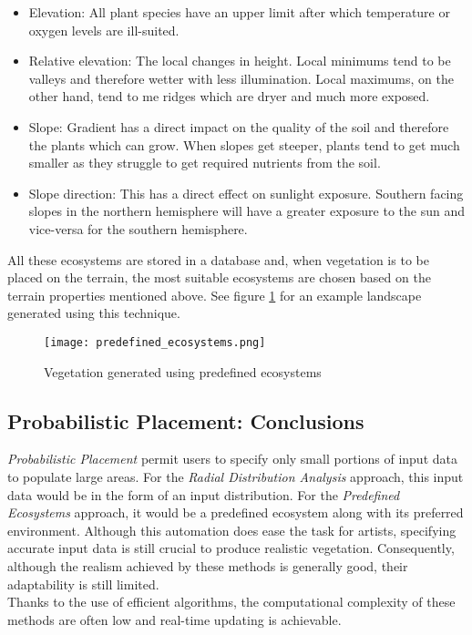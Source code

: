 \begin{itemize}
\item Elevation: All plant species have an upper limit after which temperature or oxygen levels are ill-suited.
\item Relative elevation: The local changes in height. Local minimums tend to be valleys and therefore wetter with less illumination. Local maximums, on the other hand, tend to me ridges which are dryer and much more exposed.
\item Slope: Gradient has a direct impact on the quality of the soil and therefore the plants which can grow. When slopes get steeper, plants tend to get much smaller as they struggle to get required nutrients from the soil.
\item Slope direction: This has a direct effect on sunlight exposure. Southern facing slopes in the northern hemisphere will have a greater exposure to the sun and vice-versa for the southern hemisphere.  
\end{itemize}

All these ecosystems are stored in a database and, when vegetation is to be placed on the terrain, the most suitable ecosystems are chosen based on the terrain properties mentioned above. See figure \ref{fig:vegetation_generated_using_predefined_ecosystems} for an example landscape generated using this technique.

\begin{figure}[h]
  \centering
	\texttt{[image: predefined\_ecosystems.png]}
	\caption{Vegetation generated using predefined ecosystems \cite{Hammes2001}}
	\label{fig:vegetation_generated_using_predefined_ecosystems}
\end{figure}

\subsection{Probabilistic Placement: Conclusions}

\textit{Probabilistic Placement} permit users to specify only small portions of input data to populate large areas. For the \textit{Radial Distribution Analysis} approach, this input data would be in the form of an input distribution. For the \textit{Predefined Ecosystems} approach, it would be a predefined ecosystem along with its preferred environment. Although this automation does ease the task for artists, specifying accurate input data is still crucial to produce realistic vegetation. Consequently, although the realism achieved by these methods is generally good, their adaptability is still limited. \\
Thanks to the use of efficient algorithms, the computational complexity of these methods are often low and real-time updating is achievable. 

